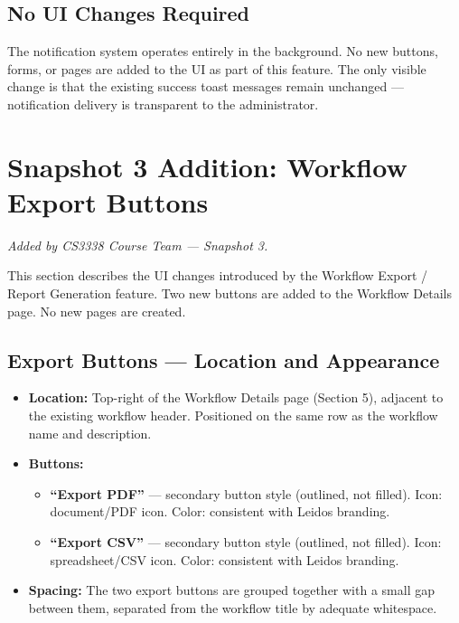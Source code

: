 \documentclass[12pt]{article}
\begin{document}
\subsection{No UI Changes Required}
The notification system operates entirely in the background. No new buttons, forms, or pages
are added to the UI as part of this feature. The only visible change is that the existing
success toast messages remain unchanged --- notification delivery is transparent to the
administrator.

\section{Snapshot 3 Addition: Workflow Export Buttons}
\textit{Added by CS3338 Course Team --- Snapshot 3.}

This section describes the UI changes introduced by the Workflow Export / Report Generation
feature. Two new buttons are added to the Workflow Details page. No new pages are created.

\subsection{Export Buttons — Location and Appearance}
\begin{itemize}
    \item \textbf{Location:} Top-right of the Workflow Details page (Section 5), adjacent
    to the existing workflow header. Positioned on the same row as the workflow name and
    description.
    \item \textbf{Buttons:}
    \begin{itemize}
        \item \textbf{``Export PDF''} --- secondary button style (outlined, not filled).
        Icon: document/PDF icon. Color: consistent with Leidos branding.
        \item \textbf{``Export CSV''} --- secondary button style (outlined, not filled).
        Icon: spreadsheet/CSV icon. Color: consistent with Leidos branding.
    \end{itemize}
    \item \textbf{Spacing:} The two export buttons are grouped together with a small gap
    between them, separated from the workflow title by adequate whitespace.
\end{itemize}
\end{document}
